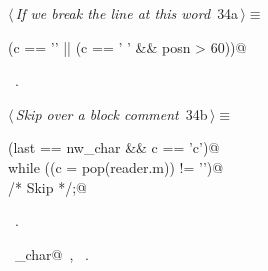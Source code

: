 \documentclass[a4paper]{report}
\begin{document}
\begin{flushleft} \small
\begin{minipage}{\linewidth}\label{scrap61}\raggedright\small
{} $\langle\,${\it If we break the line at this word}\nobreak\ {\footnotesize {34a}}$\,\rangle\equiv$
\vspace{-1ex}
\begin{list}{}{} \item
\mbox{}\verb@if (c == '\n' || (c == ' ' && posn > 60))@{\NWsep}
\end{list}
\vspace{-1.5ex}
\footnotesize
\begin{list}{}{\setlength{\itemsep}{-\parsep}\setlength{\itemindent}{-\leftmargin}}
\item \NWtxtMacroRefIn\ .

\item{}
\end{list}
\end{minipage}\vspace{4ex}
\end{flushleft}
\begin{flushleft} \small
\begin{minipage}{\linewidth}\label{scrap62}\raggedright\small
{} $\langle\,${\it Skip over a block comment}\nobreak\ {\footnotesize {34b}}$\,\rangle\equiv$
\vspace{-1ex}
\begin{list}{}{} \item
\mbox{}\verb@if (last == nw_char && c == 'c')@\\
\mbox{}\verb@   while ((c = pop(reader.m)) != '\0')@\\
\mbox{}\verb@      /* Skip */;@\\
\mbox{}\verb@@{\NWsep}
\end{list}
\vspace{-1.5ex}
\footnotesize
\begin{list}{}{\setlength{\itemsep}{-\parsep}\setlength{\itemindent}{-\leftmargin}}
\item \NWtxtMacroRefIn\ .
\item \NWtxtIdentsUsed\nobreak\  \verb@nw_char@\nobreak\ , \verb@pop@\nobreak\ .
\item{}
\end{list}
\end{minipage}\vspace{4ex}
\end{flushleft}
\end{document}
